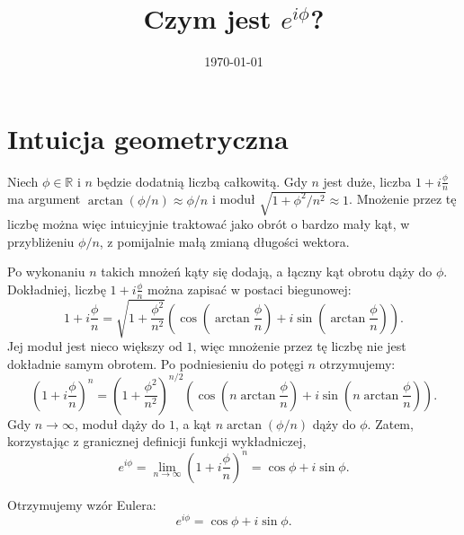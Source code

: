 \documentclass{article}
\title{Czym jest $e^{i\phi}$?}
\date{\today}
\begin{document}
\maketitle

\section{Intuicja geometryczna}
Niech $\phi \in \mathbb{R}$ i $n$ będzie dodatnią liczbą całkowitą.
Gdy $n$ jest duże, liczba $1+i\frac{\phi}{n}$ ma argument
$\arctan(\phi/n)\approx\phi/n$ i moduł
$\sqrt{1+\phi^2/n^2}\approx 1$. Mnożenie przez tę liczbę można więc
intuicyjnie traktować jako obrót o bardzo mały kąt, w przybliżeniu
$\phi/n$, z pomijalnie małą zmianą długości wektora.

Po wykonaniu $n$ takich mnożeń kąty się dodają, a łączny kąt obrotu
dąży do $\phi$. Dokładniej, liczbę $1+i\frac{\phi}{n}$ można zapisać
w postaci biegunowej:
\[
    1+i\frac{\phi}{n}
    =
    \sqrt{1+\frac{\phi^2}{n^2}}
    \left(
        \cos\left(\arctan\frac{\phi}{n}\right)
        + i\sin\left(\arctan\frac{\phi}{n}\right)
    \right).
\]
Jej moduł jest nieco większy od $1$, więc mnożenie przez tę liczbę nie
jest dokładnie samym obrotem. Po podniesieniu do potęgi $n$ otrzymujemy:
\[
    \left(1+i\frac{\phi}{n}\right)^n
    =
    \left(1+\frac{\phi^2}{n^2}\right)^{n/2}
    \left(
        \cos\left(n\arctan\frac{\phi}{n}\right)
        +i\sin\left(n\arctan\frac{\phi}{n}\right)
    \right).
\]
Gdy $n\to\infty$, moduł dąży do $1$, a kąt $n\arctan(\phi/n)$ dąży do
$\phi$. Zatem, korzystając z granicznej definicji funkcji wykładniczej,
\[
    e^{i\phi}
    =
    \lim_{n\to\infty}\left(1+i\frac{\phi}{n}\right)^n
    =
    \cos\phi+i\sin\phi.
\]

Otrzymujemy wzór Eulera:
\[
    e^{i\phi} = \cos\phi + i\sin\phi.
\]


\end{document}
